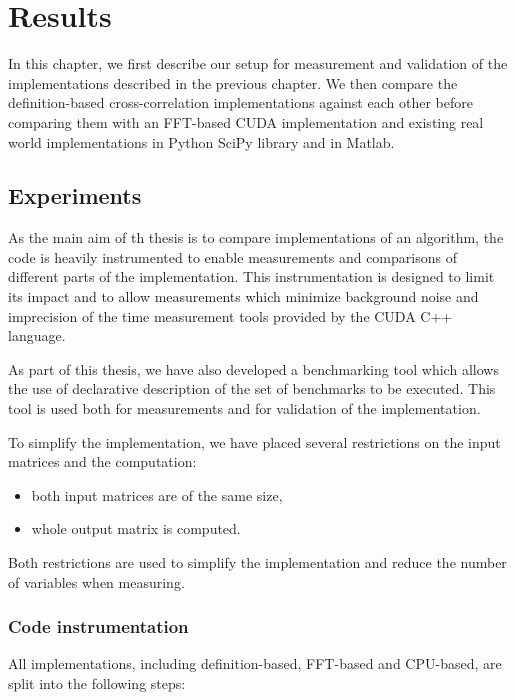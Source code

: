 \chapter{Results}

In this chapter, we first describe our setup for measurement and validation of the implementations described in the previous chapter. We then compare the definition-based cross-correlation implementations against each other before comparing them with an FFT-based CUDA implementation and existing real world implementations in Python SciPy library and in Matlab.

\section{Experiments}
As the main aim of th thesis is to compare implementations of an algorithm, the code is heavily instrumented to enable measurements and comparisons of different parts of the implementation. This instrumentation is designed to limit its impact and to allow measurements which minimize background noise and imprecision of the time measurement tools provided by the CUDA C++ language.

As part of this thesis, we have also developed a benchmarking tool which allows the use of declarative description of the set of benchmarks to be executed. This tool is used both for measurements and for validation of the implementation.


To simplify the implementation, we have placed several restrictions on the input matrices and the computation:
\begin{itemize}
	\item both input matrices are of the same size,
	\item whole output matrix is computed.
\end{itemize}

Both restrictions are used to simplify the implementation and reduce the number of variables when measuring.

\subsection{Code instrumentation}

All implementations, including definition-based, FFT-based and CPU-based, are split into the following steps:

